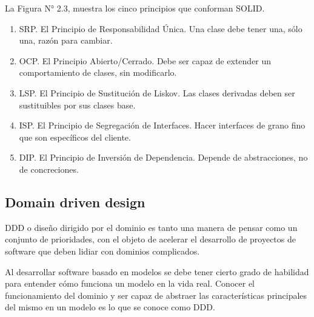 \documentclass{article}
\begin{document}
\begin{multicols}{2}
\begin{center}
La Figura N° 2.3, muestra los cinco principios que conforman SOLID.
\end{center}

\begin{enumerate}
\item SRP. El Principio de Responsabilidad Única. Una clase debe tener una, sólo una, razón para cambiar.
\item OCP. El Principio Abierto/Cerrado. Debe ser capaz de extender un comportamiento de clases, sin modificarlo.
\item LSP. El Principio de Sustitución de Liskov. Las clases derivadas deben ser sustituibles por sus clases base.
\item ISP. El Principio de Segregación de Interfaces. Hacer interfaces de grano fino que son específicos del cliente.
\item DIP. El Principio de Inversión de Dependencia. Depende de abstracciones, no de concreciones.
\end{enumerate}

\subsection{Domain driven design}
DDD o diseño dirigido por el dominio es tanto una manera de pensar como un conjunto de prioridades, con el objeto de acelerar el desarrollo de proyectos de software que deben lidiar con dominios complicados.

Al desarrollar software basado en modelos se debe tener cierto grado de habilidad para entender cómo funciona un modelo en la vida real. Conocer el funcionamiento del dominio y ser capaz de abstraer las características principales del mismo en un modelo es lo que se conoce como DDD.


\end{multicols}
\end{document}
